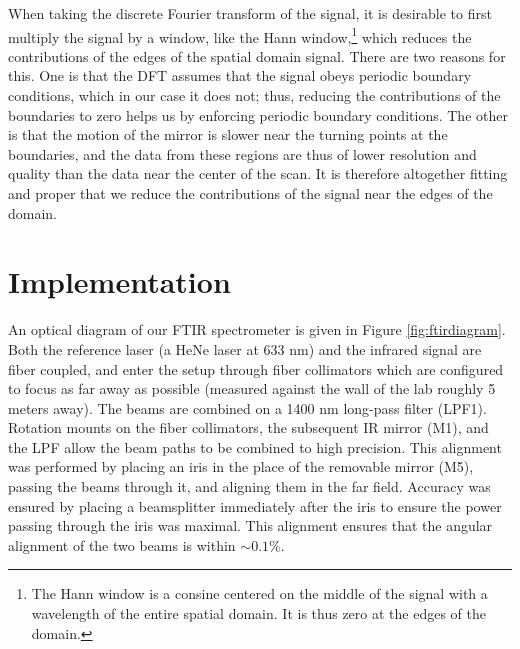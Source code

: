 \documentclass[12pt]{puthesis}
\begin{document}
When taking the discrete Fourier transform of the signal, it is desirable to first multiply the signal by a window, like the Hann window,\footnote{The Hann window is a consine centered on the middle of the signal with a wavelength of the entire spatial domain. It is thus zero at the edges of the domain.} which reduces the contributions of the edges of the spatial domain signal. There are two reasons for this. One is that the DFT assumes that the signal obeys periodic boundary conditions, which in our case it does not; thus, reducing the contributions of the boundaries to zero helps us by enforcing periodic boundary conditions. The other is that the motion of the mirror is slower near the turning points at the boundaries, and the data from these regions are thus of lower resolution and quality than the data near the center of the scan. It is therefore altogether fitting and proper that we reduce the contributions of the signal near the edges of the domain.

\section{Implementation}

An optical diagram of our FTIR spectrometer is given in Figure \ref{fig:ftirdiagram}. Both the reference laser (a HeNe laser at 633 nm) and the infrared signal are fiber coupled, and enter the setup through fiber collimators which are configured to focus as far away as possible (measured against the wall of the lab roughly 5 meters away). The beams are combined on a 1400 nm long-pass filter (LPF1). Rotation mounts on the fiber collimators, the subsequent IR mirror (M1), and the LPF allow the beam paths to be combined to high precision. This alignment was performed by placing an iris in the place of the removable mirror (M5), passing the beams through it, and aligning them in the far field. Accuracy was ensured by placing a beamsplitter immediately after the iris to ensure the power passing through the iris was maximal. This alignment ensures that the angular alignment of the two beams is within $\sim 0.1\%$.
\end{document}
